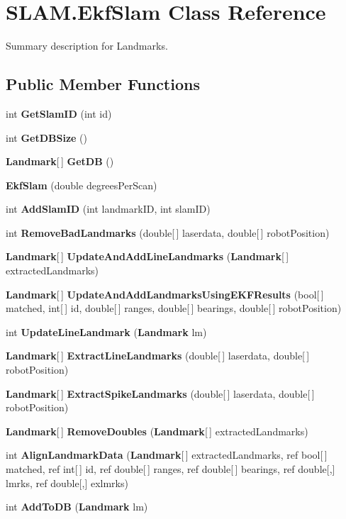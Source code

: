 \section{S\-L\-A\-M.\-Ekf\-Slam Class Reference}
\label{class_s_l_a_m_1_1_ekf_slam}


Summary description for Landmarks.  


\subsection*{Public Member Functions}
\begin{DoxyCompactItemize}
\item 
int {\bf Get\-Slam\-I\-D} (int id)
\item 
int {\bf Get\-D\-B\-Size} ()
\item 
{\bf Landmark}[$\,$] {\bf Get\-D\-B} ()
\item 
{\bf Ekf\-Slam} (double degrees\-Per\-Scan)
\item 
int {\bf Add\-Slam\-I\-D} (int landmark\-I\-D, int slam\-I\-D)
\item 
int {\bf Remove\-Bad\-Landmarks} (double[$\,$] laserdata, double[$\,$] robot\-Position)
\item 
{\bf Landmark}[$\,$] {\bf Update\-And\-Add\-Line\-Landmarks} ({\bf Landmark}[$\,$] extracted\-Landmarks)
\item 
{\bf Landmark}[$\,$] {\bf Update\-And\-Add\-Landmarks\-Using\-E\-K\-F\-Results} (bool[$\,$] matched, int[$\,$] id, double[$\,$] ranges, double[$\,$] bearings, double[$\,$] robot\-Position)
\item 
int {\bf Update\-Line\-Landmark} ({\bf Landmark} lm)
\item 
{\bf Landmark}[$\,$] {\bf Extract\-Line\-Landmarks} (double[$\,$] laserdata, double[$\,$] robot\-Position)
\item 
{\bf Landmark}[$\,$] {\bf Extract\-Spike\-Landmarks} (double[$\,$] laserdata, double[$\,$] robot\-Position)
\item 
{\bf Landmark}[$\,$] {\bf Remove\-Doubles} ({\bf Landmark}[$\,$] extracted\-Landmarks)
\item 
int {\bf Align\-Landmark\-Data} ({\bf Landmark}[$\,$] extracted\-Landmarks, ref bool[$\,$] matched, ref int[$\,$] id, ref double[$\,$] ranges, ref double[$\,$] bearings, ref double[,] lmrks, ref double[,] exlmrks)
\item 
int {\bf Add\-To\-D\-B} ({\bf Landmark} lm)
\end{DoxyCompactItemize}
